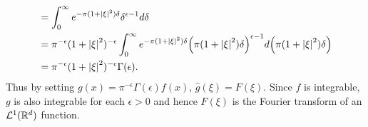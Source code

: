 \begin{pf}
\begin{equation*}
\begin{split}
            &= \int_0^\infty e^{-\pi(1+\abs{\xi}^2)\delta}\delta^{\epsilon-1}d\delta \\
            &= \pi^{-\epsilon}(1+\abs{\xi}^2)^{-\epsilon}\int_0^\infty e^{-\pi(1+\abs{\xi}^2)\delta}\pth{\pi(1+\abs{\xi}^2)\delta}^{\epsilon-1}d\pth{\pi(1+\abs{\xi}^2)\delta} \\
            &= \pi^{-\epsilon} (1+\abs{\xi}^2)^{-\epsilon}\Gamma(\epsilon).
        \end{split}
    \end{equation*}
    Thus by setting $g(x) = \pi^{-\epsilon}\Gamma(\epsilon)f(x)$, $\hat{g}(\xi) = F(\xi)$. 
    Since $f$ is integrable, $g$ is also integrable for each $\epsilon>0$ and hence 
    $F(\xi)$ is the Fourier transform of an $\mathcal{L}^1(\mathbb{R}^d)$ function.
\end{pf}